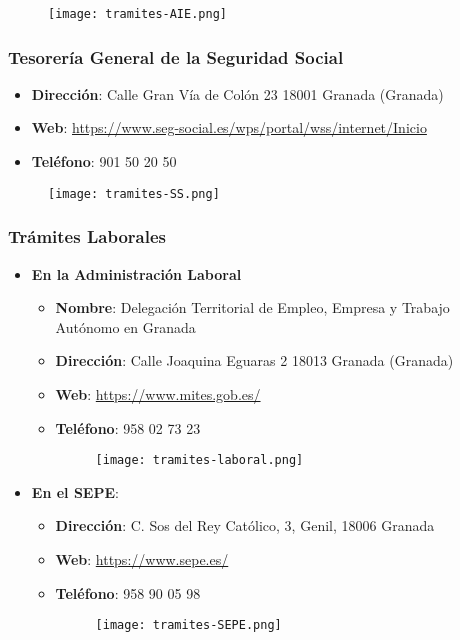 \begin{figure}[H]
    \centering
    \texttt{[image: tramites-AIE.png]}
\end{figure}

\subsubsection*{Tesorería General de la Seguridad Social}
\begin{itemize}
    \item \textbf{Dirección}: Calle Gran Vía de Colón 23 18001 Granada (Granada)
    \item \textbf{Web}: \url{https://www.seg-social.es/wps/portal/wss/internet/Inicio}
    \item \textbf{Teléfono}: 901 50 20 50
\end{itemize}

\begin{figure}[H]
    \centering
    \texttt{[image: tramites-SS.png]}
\end{figure}

\subsubsection*{Trámites Laborales}

\begin{itemize}
    \item \textbf{En la Administración Laboral}
    \begin{itemize}
        \item \textbf{Nombre}: Delegación Territorial de Empleo, Empresa y Trabajo Autónomo en Granada
        \item \textbf{Dirección}: Calle Joaquina Eguaras 2 18013 Granada (Granada)
        \item \textbf{Web}: \url{https://www.mites.gob.es/}
        \item \textbf{Teléfono}: 958 02 73 23

        \begin{figure}[H]
            \centering
            \texttt{[image: tramites-laboral.png]}
        \end{figure}
    \end{itemize}
    \item \textbf{En el SEPE}:
    \begin{itemize}
        \item \textbf{Dirección}:  C. Sos del Rey Católico, 3, Genil, 18006 Granada
        \item \textbf{Web}: \url{https://www.sepe.es/}
        \item \textbf{Teléfono}: 958 90 05 98

        \begin{figure}[H]
            \centering
            \texttt{[image: tramites-SEPE.png]}
        \end{figure}
    \end{itemize}
\end{itemize}

